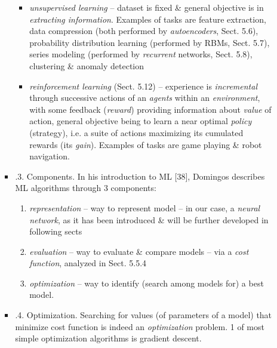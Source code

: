 \documentclass{article}
\begin{document}
\begin{itemize}
\begin{itemize}
\begin{itemize}
\begin{itemize}
				\item {\it unsupervised learning} -- dataset is fixed \& general objective is in {\it extracting information}. Examples of tasks are feature extraction, data compression (both performed by {\it autoencoders}, Sect. 5.6), probability distribution learning (performed by RBMs, Sect. 5.7), series modeling (performed by {\it recurrent} networks, Sect. 5.8), clustering \& anomaly detection
				\item {\it reinforcement learning} (Sect. 5.12) -- experience is {\it incremental} through successive actions of an {\it agents} within an {\it environment}, with some feedback ({\it reward}) providing information about {\it value} of action, general objective being to learn a near optimal {\it policy} (strategy), i.e. a suite of actions maximizing its cumulated rewards (its {\it gain}). Examples of tasks are game playing \& robot navigation.
			\end{itemize}
			\item {.3. Components.} In his introduction to ML [38], {\sc Domingos} describes ML algorithms through 3 components:
			\begin{enumerate}
				\item {\it representation} -- way to represent model -- in our case, a {\it neural network}, as it has been introduced \& will be further developed in following sects
				\item {\it evaluation} -- way to evaluate \& compare models -- via a {\it cost function}, analyzed in Sect. 5.5.4
				\item {\it optimization} -- way to identify (search among models for) a best model.
			\end{enumerate}
			\item {.4. Optimization.} Searching for values (of parameters of a model) that minimize cost function is indeed an {\it optimization} problem. 1 of most simple optimization algorithms is gradient descent.
			

\end{itemize}
\end{itemize}
\end{itemize}
\end{document}
